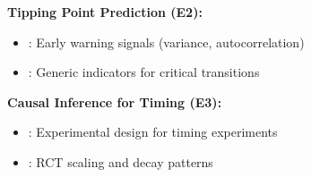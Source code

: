 \begin{tcolorbox}[colback=green!5!white, colframe=green!75!black,
    title=\textbf{PRO Evidence: Supporting Literature}]
\textbf{Tipping Point Prediction (E2):}
\begin{itemize}[nosep]
\item \citet{scheffer2009early}: Early warning signals (variance, autocorrelation)
\item \citet{scheffer2012anticipating}: Generic indicators for critical transitions
\end{itemize}

\textbf{Causal Inference for Timing (E3):}
\begin{itemize}[nosep]
\item \citet{athey2017econometrics}: Experimental design for timing experiments
\item \citet{PAP-dellavigna2022rcts}: RCT scaling and decay patterns
\end{itemize}

\end{tcolorbox}

